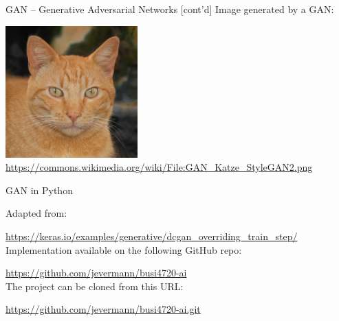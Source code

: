 \documentclass[ignorenonframetext,xcolor=x11names]{beamer}
\begin{document}
\begin{frame}{GAN -- Generative Adversarial Networks \small [cont'd]}
Image generated by a GAN:

\begin{center}
\includegraphics[height=2in]{GAN_Katze_StyleGAN2.png} \\

\scriptsize \url{https://commons.wikimedia.org/wiki/File:GAN_Katze_StyleGAN2.png} \normalsize
\end{center}

\end{frame}





\begin{frame}{GAN in Python}

Adapted from: 

\small\url{https://keras.io/examples/generative/dcgan_overriding_train_step/}\normalsize \\

Implementation available on the following GitHub repo:

\small\url{https://github.com/jevermann/busi4720-ai}\normalsize \\

The project can be cloned from this URL:

\small\url{https://github.com/jevermann/busi4720-ai.git}\normalsize
\end{frame}
\end{document}
